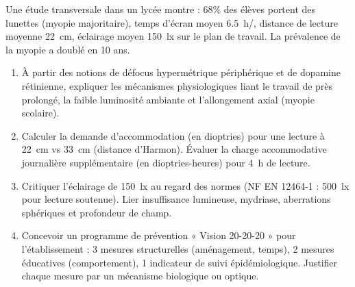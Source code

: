 \documentclass[11pt]{article}
\begin{document}
\begin{exercice}
Une étude transversale dans un lycée montre : 68\% des élèves portent des lunettes (myopie majoritaire), temps d'écran moyen \SI{6,5}{\hour}/, distance de lecture moyenne \SI{22}{\centi\meter}, éclairage moyen \SI{150}{\lux} sur le plan de travail. La prévalence de la myopie a doublé en 10 ans.
\begin{enumerate}
    \item À partir des notions de défocus hypermétrique périphérique et de dopamine rétinienne, expliquer les mécanismes physiologiques liant le travail de près prolongé, la faible luminosité ambiante et l'allongement axial (myopie scolaire).
    \item Calculer la demande d'accommodation (en dioptries) pour une lecture à \SI{22}{\centi\meter} vs \SI{33}{\centi\meter} (distance d'Harmon). Évaluer la charge accommodative journalière supplémentaire (en dioptries-heures) pour \SI{4}{\hour} de lecture.
    \item Critiquer l'éclairage de \SI{150}{\lux} au regard des normes (NF EN 12464-1 : \SI{500}{\lux} pour lecture soutenue). Lier insuffisance lumineuse, mydriase, aberrations sphériques et profondeur de champ.
    \item Concevoir un programme de prévention « Vision 20-20-20 » pour l'établissement : 3 mesures structurelles (aménagement, temps), 2 mesures éducatives (comportement), 1 indicateur de suivi épidémiologique. Justifier chaque mesure par un mécanisme biologique ou optique.
\end{enumerate}
\end{exercice}
\end{document}
